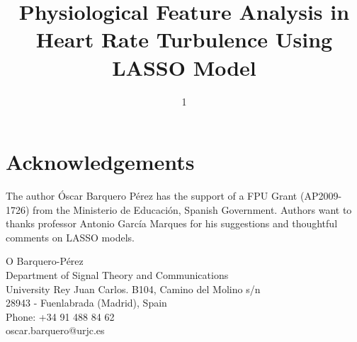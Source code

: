\documentclass[twocolumn]{cinc}
\begin{document}


\title{Physiological Feature Analysis in Heart Rate Turbulence Using LASSO Model}
\author{1}

\maketitle





%

% 



\section*{Acknowledgements}
The author \'Oscar Barquero P\'erez has the support of a FPU Grant (AP2009-1726) from the Ministerio de Educaci\'on, Spanish Government. Authors want to thanks professor Antonio Garc\'ia Marques for his suggestions and thoughtful comments on LASSO models.

\begin{correspondence}
O Barquero-P\'erez\\
Department of Signal Theory and Communications\\
University Rey Juan Carlos. B104, Camino del Molino s/n\\
28943 - Fuenlabrada (Madrid), Spain\\
Phone: +34 91 488 84 62\\
oscar.barquero@urjc.es
 \end{correspondence}
\end{document}
